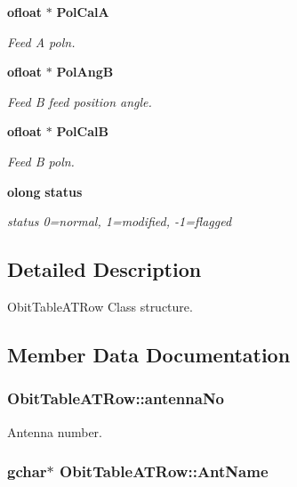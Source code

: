 \begin{CompactItemize}
{\bf ofloat} $\ast$ {\bf Pol\-Cal\-A}
\begin{CompactList}\small\item\em Feed A poln. \item\end{CompactList}\item 
{\bf ofloat} $\ast$ {\bf Pol\-Ang\-B}
\begin{CompactList}\small\item\em Feed B feed position angle. \item\end{CompactList}\item 
{\bf ofloat} $\ast$ {\bf Pol\-Cal\-B}
\begin{CompactList}\small\item\em Feed B poln. \item\end{CompactList}\item 
{\bf olong} {\bf status}
\begin{CompactList}\small\item\em status 0=normal, 1=modified, -1=flagged \item\end{CompactList}\end{CompactItemize}


\subsection{Detailed Description}
Obit\-Table\-ATRow Class structure. 



\subsection{Member Data Documentation}
\subsubsection{ {\bf Obit\-Table\-ATRow::antenna\-No}}\label{structObitTableATRow_o8}


Antenna number. 

\subsubsection{\setlength{\rightskip}{0pt plus 5cm}gchar$\ast$ {\bf Obit\-Table\-ATRow::Ant\-Name}}\label{structObitTableATRow_o13}


